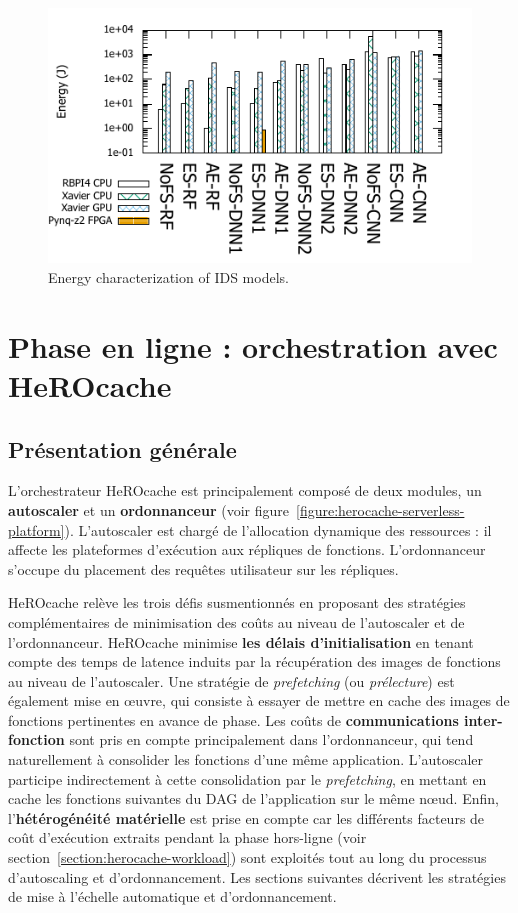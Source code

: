 \begin{figure}
    \centering
    \includegraphics[width=0.9\columnwidth]{5_Chapitre5/figures/energy_bar.pdf}
    \caption{Energy characterization of IDS models.}
    \label{figure:herocache-energy}
\end{figure}

\section{Phase en ligne : orchestration avec HeROcache} \label{section:herocache-contribution}

\subsection{Présentation générale}

L'orchestrateur HeROcache est principalement composé de deux modules, un \textbf{autoscaler} et un \textbf{ordonnanceur} (voir figure~\ref{figure:herocache-serverless-platform}). L'autoscaler est chargé de l'allocation dynamique des ressources : il affecte les plateformes d'exécution aux répliques de fonctions. L'ordonnanceur s'occupe du placement des requêtes utilisateur sur les répliques.

HeROcache relève les trois défis susmentionnés en proposant des stratégies complémentaires de minimisation des coûts au niveau de l'autoscaler et de l'ordonnanceur. HeROcache minimise \textbf{les délais d'initialisation} en tenant compte des temps de latence induits par la récupération des images de fonctions au niveau de l'autoscaler. Une stratégie de \textit{prefetching} (ou \textit{prélecture}) est également mise en œuvre, qui consiste à essayer de mettre en cache des images de fonctions pertinentes en avance de phase. Les coûts de \textbf{communications inter-fonction} sont pris en compte principalement dans l'ordonnanceur, qui tend naturellement à consolider les fonctions d'une même application. L'autoscaler participe indirectement à cette consolidation par le \textit{prefetching}, en mettant en cache les fonctions suivantes du DAG de l'application sur le même nœud. Enfin, l'\textbf{hétérogénéité matérielle} est prise en compte car les différents facteurs de coût d'exécution extraits pendant la phase hors-ligne (voir section~\ref{section:herocache-workload}) sont exploités tout au long du processus d'autoscaling et d'ordonnancement. Les sections suivantes décrivent les stratégies de mise à l'échelle automatique et d'ordonnancement.


